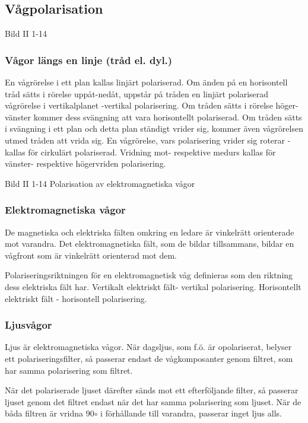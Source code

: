 \documentclass[a4paper,twoside,twocolumn,openright]{book}
\begin{document}
\subsection{Vågpolarisation}

Bild II 1-14

\subsubsection{Vågor längs en linje (tråd el. dyl.)}
En vågrörelse i ett plan kallas linjärt polariserad. Om änden på en horisontell tråd sätts
i rörelse uppåt-nedåt, uppstår på tråden en linjärt polariserad vågrörelse i vertikalplanet
-vertikal polarisering.
Om tråden sätts i rörelse höger-vänster kommer dess svängning att vara horisontellt
polariserad.
Om tråden sätts i svängning i ett plan och detta plan ständigt vrider sig, kommer även
vågrörelsen utmed tråden att vrida sig. En vågrörelse, vars polarisering vrider sig
roterar - kallas för cirkulärt polariserad. Vridning mot- respektive medurs kallas för
vänster- respektive högervriden polarisering.

Bild II 1-14 Polarisation av elektromagnetiska vågor

\subsubsection{Elektromagnetiska vågor}

De magnetiska och elektriska fälten omkring en ledare är vinkelrätt orienterade mot
varandra. Det elektromagnetiska fält, som de bildar tillsammans, bildar en vågfront som är
vinkelrätt orienterad mot dem.

Polariseringsriktningen för en elektromagnetisk våg definieras som den riktning dess
elektriska fält har.
Vertikalt elektriskt fält- vertikal polarisering.
Horisontellt elektriskt fält - horisontell polarisering.

\subsubsection{Ljusvågor}

Ljus är elektromagnetiska vågor. När dagsljus, som f.ö. är opolariserat, belyser ett
polariseringsfilter, så passerar endast de vågkomposanter genom filtret, som har samma
polarisering som filtret.

När det polariserade ljuset därefter sänds mot ett efterföljande filter, så passerar ljuset
genom det filtret endast när det har samma polarisering som ljuset. När de båda filtren är
vridna 90$\circ$ i förhållande till varandra, passerar inget ljus alls.
\end{document}
